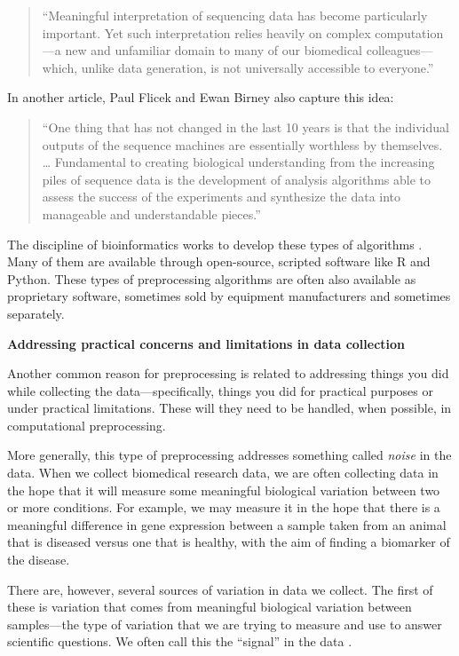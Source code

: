 \documentclass[]{tufte-book}
\begin{document}
\begin{quote}
``Meaningful interpretation of sequencing data has become particularly
important. Yet such interpretation relies heavily on complex computation---a new
and unfamiliar domain to many of our biomedical colleagues---which, unlike
data generation, is not universally accessible to everyone.''
\citep{nekrutenko2012next}
\end{quote}

In another article, Paul Flicek and Ewan Birney also capture this idea:

\begin{quote}
``One thing that has not changed in the last 10 years is that the individual
outputs of the sequence machines are essentially worthless by themselves. \ldots{}
Fundamental to creating biological understanding from
the increasing piles of sequence data is the development of analysis algorithms
able to assess the success of the experiments and synthesize the data into
manageable and understandable pieces.''
\citep{flicek2009sense}
\end{quote}

The discipline of bioinformatics works to develop these types of algorithms
\citep{barry2009new}. Many of them are available through open-source, scripted
software like R and Python. These types of preprocessing algorithms are often
also available as proprietary software, sometimes sold by equipment
manufacturers and sometimes separately.

\textbf{Addressing practical concerns and limitations in data collection}

Another common reason for preprocessing is related to addressing things you
did while collecting the data---specifically, things you did for
practical purposes or under practical limitations. These will they need to
be handled, when possible, in computational preprocessing.

More generally, this type of preprocessing addresses something called
\emph{noise} in the data. When we collect biomedical
research data, we are often collecting data in the hope that it will measure
some meaningful biological variation between two or more conditions. For
example, we may measure it in the hope that there is a meaningful difference in
gene expression between a sample taken from an animal that is diseased versus
one that is healthy, with the aim of finding a biomarker of the disease.

There are, however, several sources of variation in data we collect. The first
of these is variation that comes from meaningful biological variation between
samples---the type of variation that we are trying to measure and
use to answer scientific questions. We often call this the ``signal'' in the
data \citep{chatfield1995problem}.
\end{document}
